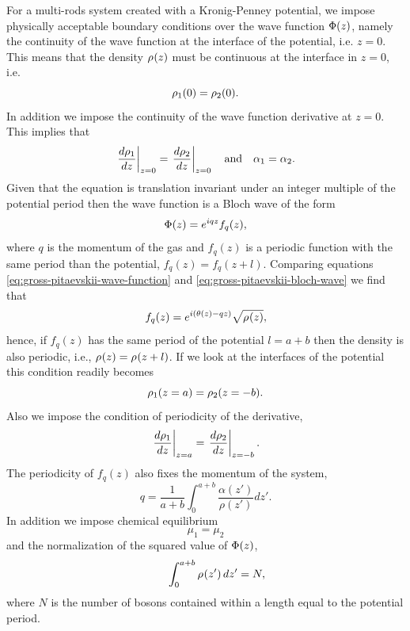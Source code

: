For a multi-rods system created with a Kronig-Penney potential, we impose
physically acceptable boundary conditions over the wave function ${\Phi}(z)$,
namely the continuity of the wave function at the interface of the potential,
i.e. $z = 0$. This means that the density ${\rho_{}}(z)$ must be continuous at the
interface in $z=0$, i.e.
%
\begin{equation}
	\label{eq:gross-pitaevskii-density-continuity}
	\gprho[1](0) = \gprho[2](0).
\end{equation}
%
In addition we impose the continuity of the wave function derivative at $z = 0$. This implies that
%
\begin{align}
	\label{eq:gross-pitaevskii-density-derivative-continuity}
	\left. \frac{d\gprho[1]}{dz}\right|_{z=0} = \left. \frac{d\gprho[2]}{dz}\right|_{z=0} \quad \mathrm{and} \quad \alpha_1 = \alpha_2.
\end{align}
%
Given that the {\GP} equation is translation invariant under an integer
multiple of the potential period then the wave function is a Bloch wave of the form
%
\begin{equation}
	\label{eq:gross-pitaevskii-bloch-wave}
	\gpwavefunc(z) = e^{i q z} f_q(z),
\end{equation}
%
where $q$ is the momentum of the gas and $f_q(z)$ is a periodic function with the same period
than the potential, $f_q(z) = f_q(z + l)$. Comparing equations \eqref{eq:gross-pitaevskii-wave-function} and \eqref{eq:gross-pitaevskii-bloch-wave} we
find that
%
\begin{equation}
	f_q(z) = e^{i (\theta(z) - q z)} \sqrt{{\rho_{}}(z)},
\end{equation}
%
hence, if $f_q(z)$ has the same period of the potential $l = a + b$ then the density is also periodic, i.e.,
${\rho_{}}(z) = {\rho_{}}(z + l)$. If we look at the interfaces of the potential this condition readily
becomes
%
\begin{equation}
	\label{eq:gross-pitaevskii-density-periodicity}
	\gprho[1](z = a) = \gprho[2](z = -b).
\end{equation}
%
Also we impose the condition of periodicity of the derivative,
%
\begin{equation}
	\label{eq:gross-pitaevskii-density-derivative-periodicity}
	\left. \frac{d\gprho[1]}{dz}\right|_{z=a} = \left. \frac{d\gprho[2]}{dz}\right|_{z=-b}.
\end{equation}
%
The periodicity of $f_q(z)$ also fixes the momentum of the system,
%
\begin{equation}
	\label{eq:gross-pitaevskii-system-momentum}
	q = \frac{1}{a + b} \int_{0}^{a+b} \frac{\alpha(z')}{\rho(z')} dz'.
\end{equation}
%
In addition we impose chemical equilibrium
%
\begin{equation}
	\label{eq:gross-pitaevskii-chemical-equlibrium}
	\mu_1 = \mu_2
\end{equation}
%
and the normalization of the squared value of ${\Phi}(z)$,
%
\begin{equation}
	\label{eq:gross-pitaevskii-normalization-condition}
	\qquad \int_{0}^{a+b} \gprho(z') \, dz' = N,
\end{equation}
%
where $N$ is the number of bosons contained within a length equal to the potential period.


